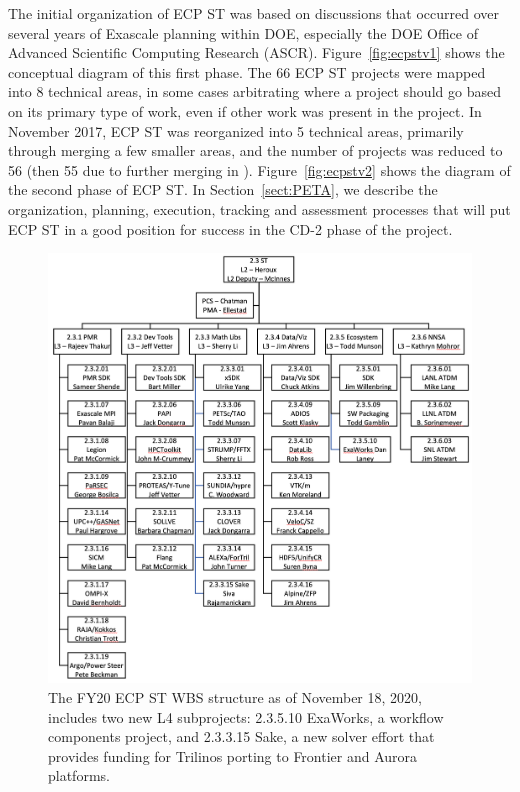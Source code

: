 The initial organization of ECP ST was based on discussions that occurred over several years of Exascale planning within DOE, especially the DOE Office of Advanced Scientific Computing Research (ASCR).  Figure~\ref{fig:ecpstv1} shows the conceptual diagram of this first phase.  The 66 ECP ST projects were mapped into 8 technical areas, in some cases arbitrating where a project should go based on its primary type of work, even if other work was present in the project.  In November 2017, ECP ST was reorganized into 5 technical areas, primarily through merging a few smaller areas, and the number of projects was reduced to 56 (then 55 due to further merging in \ecosystem).  Figure~\ref{fig:ecpstv2} shows the diagram of the second phase of ECP ST.  In Section~\ref{sect:PETA}, we describe the organization, planning, execution, tracking and assessment processes that will put ECP ST in a good position for success in the CD-2 phase of the project.

\begin{figure}
	\centering
	\includegraphics[width=0.9\linewidth]{STFY20WBS}
	\caption{\label{fig:wbs-FY20} The FY20 ECP ST WBS structure as of November 18, 2020, includes two new L4 subprojects: 2.3.5.10 ExaWorks, a workflow components project, and 2.3.3.15 Sake, a new solver effort that provides funding for Trilinos porting to Frontier and Aurora platforms.}
\end{figure}

